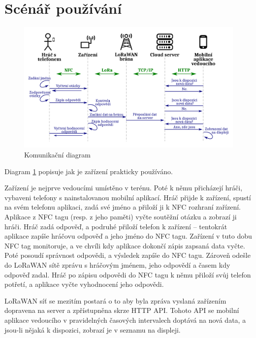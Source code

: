 \section{Scénář používání}

\begin{figure}
    \begin{centering}
        \includegraphics[width=1\textwidth]{Figures/communication-diagram}
        \caption{Komunikační diagram}
        \label{fig:Usage_comm_diag}
    \end{centering}
\end{figure}

Diagram \ref{fig:Usage_comm_diag} popisuje jak je zařízení prakticky používáno.

Zařízení je nejprve vedoucími umístěno v terénu. Poté k němu přicházejí hráči, vybaveni  telefony s nainstalovanou mobilní aplikací. Hráč přijde k zařízení, spustí na svém telefonu aplikaci, zadá své jméno a přiloží ji k NFC rozhraní zařízení. Aplikace z NFC tagu (resp. z jeho paměti) vyčte soutěžní otázku a zobrazí ji hráči. Hráč zadá odpověď, a podruhé přiloží telefon k zařízení -- tentokrát aplikace zapíše hráčovu odpověď a jeho jméno do NFC tagu.
Zařízení v tuto dobu NFC tag monitoruje, a ve chvíli kdy aplikace dokončí zápis zapsaná data vyčte. Poté posoudí správnost odpovědi, a výsledek zapíše do NFC tagu. Zároveň odešle do LoRaWAN sítě zprávu s hráčovým jménem, jeho odpovědí a časem kdy odpověď zadal.
Hráč po zápisu odpovědi do NFC tagu k němu přiloží svůj telefon potřetí, a aplikace vyčte vyhodnocení jeho odpovědi.

LoRaWAN síť se mezitím postará o to aby byla zpráva vyslaná zařízením dopravena na server a zpřístupněna skrze HTTP API. Tohoto API se mobilní aplikace vedoucího v pravidelných časových intervalech doptává na nová data, a jsou-li nějaká k dispozici, zobrazí je v seznamu na displeji.

